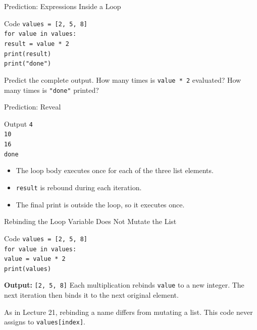 \documentclass[aspectratio=169,10pt]{beamer}
\begin{document}
\begin{frame}{Prediction: Expressions Inside a Loop}
  \begin{block}{Code}
    \texttt{values = [2, 5, 8]}\\
    \texttt{for value in values:}\\
    \hspace{0.20in}\texttt{result = value * 2}\\
    \hspace{0.20in}\texttt{print(result)}\\
    \texttt{print("done")}
  \end{block}

  \begin{activity}
    Predict the complete output. How many times is \texttt{value * 2} evaluated? How many times is \texttt{"done"} printed?
  \end{activity}
\end{frame}

\begin{frame}{Prediction: Reveal}
  \begin{block}{Output}
    \texttt{4}\\
    \texttt{10}\\
    \texttt{16}\\
    \texttt{done}
  \end{block}

  \begin{itemize}
    \item The loop body executes once for each of the three list elements.
    \item \texttt{result} is rebound during each iteration.
    \item The final print is outside the loop, so it executes once.
  \end{itemize}
\end{frame}

\begin{frame}{Rebinding the Loop Variable Does Not Mutate the List}
  \begin{block}{Code}
    \texttt{values = [2, 5, 8]}\\
    \texttt{for value in values:}\\
    \hspace{0.20in}\texttt{value = value * 2}\\
    \texttt{print(values)}
  \end{block}
  \textbf{Output:} \texttt{[2, 5, 8]}
  Each multiplication rebinds \texttt{value} to a new integer. The next iteration then binds it to the next original element.
  \begin{keyidea}
    As in Lecture 21, rebinding a name differs from mutating a list. This code never assigns to \texttt{values[index]}.
  \end{keyidea}
\end{frame}
\end{document}
